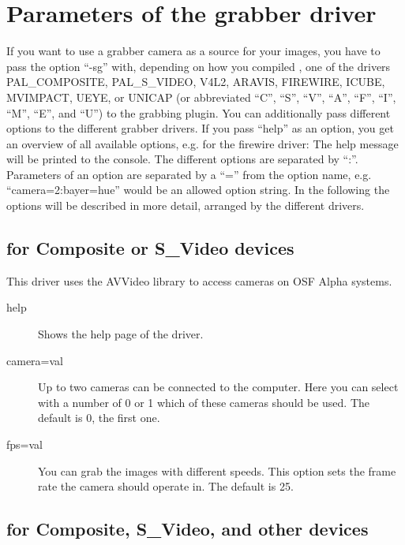 \section {Parameters of the grabber driver}
 \label{sec:para_driver}

If you want to use a grabber camera as a source for your images, you
have to pass the option ``-sg'' with, depending on how you compiled
\icewing{}, one of the drivers PAL\_COMPOSITE, PAL\_S\_VIDEO, V4L2,
ARAVIS, FIREWIRE, ICUBE, MVIMPACT, UEYE, or UNICAP (or abbreviated
``C'', ``S'', ``V'', ``A'', ``F'', ``I'', ``M'', ``E'', and ``U'')
to the grabbing plugin. You can additionally pass different options
to the different grabber drivers. If you pass ``help'' as an option,
you get an overview of all available options, e.g. for the firewire
driver:
\sS
{}
\sE
The help message will be printed to the console. The different
options are separated by ``:''. Parameters of an option are
separated by a ``='' from the option name,
e.g. ``camera=2:bayer=hue'' would be an allowed option string. In
the following the options will be described in more detail, arranged
by the different drivers.

\subsection{ for Composite or S\_Video devices}

This driver uses the AVVideo library to access cameras on OSF Alpha
systems.

\begin{description}
\item[help] Shows the help page of the driver.
\item[camera=val] Up to two cameras can be connected to the
  computer. Here you can select with a number of 0 or 1 which of
  these cameras should be used. The default is 0, the first one.
\item[fps=val] You can grab the images with different speeds. This
  option sets the frame rate the camera should operate in. The
  default is 25.
\end{description}

\subsection { for Composite, S\_Video, and other
  devices}
\label{sub:para_v4l2}

